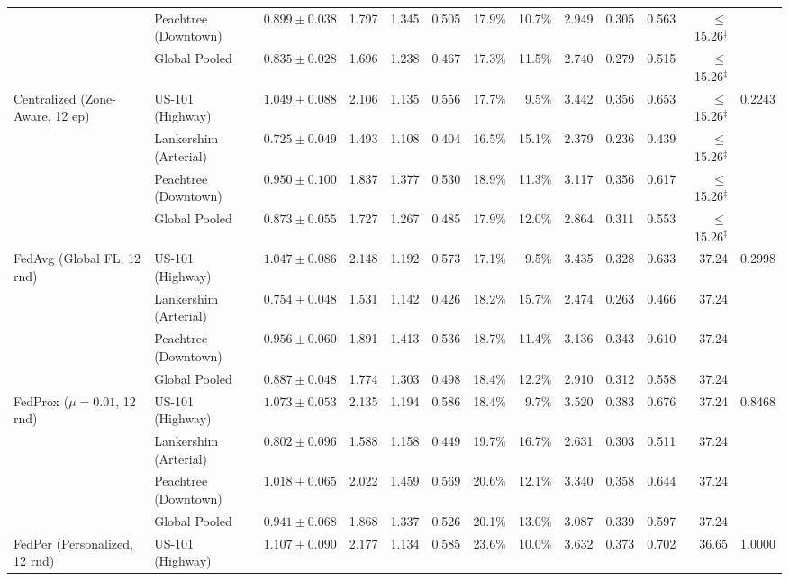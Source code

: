 \documentclass[journal]{IEEEtran}
\begin{document}
\begin{table}[!t]
{\begin{tabular}{@{}llrrrrrrrrrrr@{}}
 & Peachtree (Downtown) & $0.899 \pm 0.038$ & 1.797 & 1.345 & 0.505 & 17.9\% & 10.7\% & 2.949 & 0.305 & 0.563 & $\le$15.26$^{\ddagger}$ & \\
 & Global Pooled & $0.835 \pm 0.028$ & 1.696 & 1.238 & 0.467 & 17.3\% & 11.5\% & 2.740 & 0.279 & 0.515 & $\le$15.26$^{\ddagger}$ & \\
\midrule
\multirow{4}{*}{Centralized (Zone-Aware, 12 ep)} & US-101 (Highway) & $1.049 \pm 0.088$ & 2.106 & 1.135 & 0.556 & 17.7\% & 9.5\% & 3.442 & 0.356 & 0.653 & $\le$15.26$^{\ddagger}$ & \multirow{4}{*}{0.2243} \\
 & Lankershim (Arterial) & $0.725 \pm 0.049$ & 1.493 & 1.108 & 0.404 & 16.5\% & 15.1\% & 2.379 & 0.236 & 0.439 & $\le$15.26$^{\ddagger}$ & \\
 & Peachtree (Downtown) & $0.950 \pm 0.100$ & 1.837 & 1.377 & 0.530 & 18.9\% & 11.3\% & 3.117 & 0.356 & 0.617 & $\le$15.26$^{\ddagger}$ & \\
 & Global Pooled & $0.873 \pm 0.055$ & 1.727 & 1.267 & 0.485 & 17.9\% & 12.0\% & 2.864 & 0.311 & 0.553 & $\le$15.26$^{\ddagger}$ & \\
\midrule
\multirow{4}{*}{FedAvg (Global FL, 12 rnd)} & US-101 (Highway) & $1.047 \pm 0.086$ & 2.148 & 1.192 & 0.573 & 17.1\% & 9.5\% & 3.435 & 0.328 & 0.633 & 37.24 & \multirow{4}{*}{0.2998} \\
 & Lankershim (Arterial) & $0.754 \pm 0.048$ & 1.531 & 1.142 & 0.426 & 18.2\% & 15.7\% & 2.474 & 0.263 & 0.466 & 37.24 & \\
 & Peachtree (Downtown) & $0.956 \pm 0.060$ & 1.891 & 1.413 & 0.536 & 18.7\% & 11.4\% & 3.136 & 0.343 & 0.610 & 37.24 & \\
 & Global Pooled & $0.887 \pm 0.048$ & 1.774 & 1.303 & 0.498 & 18.4\% & 12.2\% & 2.910 & 0.312 & 0.558 & 37.24 & \\
\midrule
\multirow{4}{*}{FedProx ($\mu=0.01$, 12 rnd)} & US-101 (Highway) & $1.073 \pm 0.053$ & 2.135 & 1.194 & 0.586 & 18.4\% & 9.7\% & 3.520 & 0.383 & 0.676 & 37.24 & \multirow{4}{*}{0.8468} \\
 & Lankershim (Arterial) & $0.802 \pm 0.096$ & 1.588 & 1.158 & 0.449 & 19.7\% & 16.7\% & 2.631 & 0.303 & 0.511 & 37.24 & \\
 & Peachtree (Downtown) & $1.018 \pm 0.065$ & 2.022 & 1.459 & 0.569 & 20.6\% & 12.1\% & 3.340 & 0.358 & 0.644 & 37.24 & \\
 & Global Pooled & $0.941 \pm 0.068$ & 1.868 & 1.337 & 0.526 & 20.1\% & 13.0\% & 3.087 & 0.339 & 0.597 & 37.24 & \\
\midrule
\multirow{4}{*}{FedPer (Personalized, 12 rnd)} & US-101 (Highway) & $1.107 \pm 0.090$ & 2.177 & 1.134 & 0.585 & 23.6\% & 10.0\% & 3.632 & 0.373 & 0.702 & 36.65 & \multirow{4}{*}{1.0000} \\

\end{tabular}}
\end{table}
\end{document}
